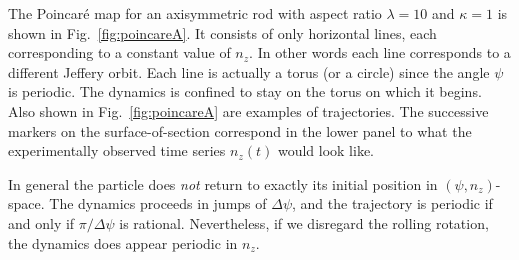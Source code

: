 \documentclass[thesis.tex]{subfiles}
\begin{document}
The Poincar\'e map for an axisymmetric rod with aspect ratio $\lambda=10$ and $\kappa=1$ is shown in Fig.~\ref{fig:poincareA}. It consists of only horizontal lines, each corresponding to a constant value of $n_z$. In other words each line corresponds to a different Jeffery orbit. Each line is actually a torus (or a circle) since the angle $\psi$ is periodic. The dynamics is confined to stay on the torus on which it begins. Also shown in Fig.~\ref{fig:poincareA} are examples of trajectories. The successive markers on the surface-of-section correspond in the lower panel to what the experimentally observed time series $n_z(t)$ would look like. 

In general the particle does \emph{not} return to exactly its initial position in $(\psi, n_z)$-space. The dynamics proceeds in jumps of $\Delta \psi$, and the trajectory is periodic if and only if $\pi/\Delta \psi$ is rational. Nevertheless, if we disregard the rolling rotation, the dynamics does appear periodic in $n_z$.
\end{document}
